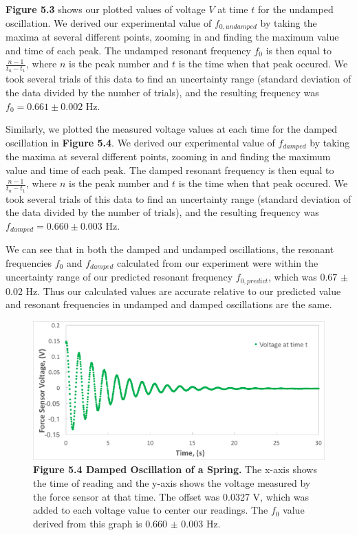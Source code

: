 \documentclass[11pt]{report}
\begin{document}
\textbf{Figure 5.3} shows our plotted values of voltage \(V\) at time \(t\) for
the undamped oscillation. We derived our experimental value of $f_{0, undamped}$ by taking the
maxima at several different points, zooming in and finding the maximum value and
time of each peak.  The undamped resonant frequency $f_{0}$ is then equal to \(\frac{n -
1}{t_n - t_1}\), where \(n\) is the peak number and \(t\) is the time when that
peak occured. We took several trials of this data to find an uncertainty range
(standard deviation of the data divided by the number of trials),
and the resulting frequency was \(f_{0} = 0.661 \pm 0.002\) Hz.  

Similarly, we plotted the measured voltage values at each time for the damped
oscillation in \textbf{Figure 5.4}. We derived our experimental value of
$f_{damped}$ by taking the
maxima at several different points, zooming in and finding the maximum value and
time of each peak.  The damped resonant frequency is then equal to \(\frac{n -
1}{t_n - t_1}\), where \(n\) is the peak number and \(t\) is the time when that
peak occured. We took several trials of this data to find an uncertainty range
(standard deviation of the data divided by the number of trials),
and the resulting frequency was \(f_{damped} = 0.660 \pm 0.003\) Hz.  

We can see that in both the damped and undamped oscillations, the resonant
frequencies \(f_0\) and \(f_{damped}\) calculated from our experiment were within the uncertainty
range of our predicted resonant frequency \(f_{0, predict}\), which was 0.67
$\pm$ 0.02 Hz.  Thus our calculated values are accurate relative to our
predicted value and resonant frequencies in undamped and damped oscillations are
the same.



\begin{figure}
    \includegraphics[width=\linewidth]{VoltageTime2.png}
    \captionsetup{labelformat=empty}
    \caption{\textbf{Figure 5.4 Damped Oscillation of a Spring.}  The x-axis
    shows the time of reading and the y-axis shows the voltage measured by the
force sensor at that time.  The offset was 0.0327 V, which was added to each
voltage value to center our readings. The \(f_0\) value derived from this graph
is 0.660 $\pm$ 0.003 Hz.}
\end{figure}
\end{document}
